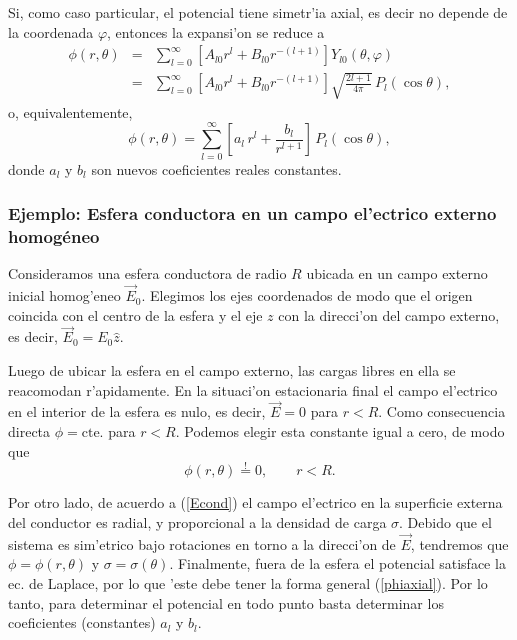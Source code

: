 Si, como caso particular, el potencial tiene simetr'ia axial, es decir no
depende de la coordenada $\varphi$, entonces la expansi'on se reduce a
\begin{eqnarray}
  \phi(r,\theta) &=& \sum_{l=0}^\infty\left[
  A_{l0}  r^l + B_{l0}  r^{-(l+1)}\right]  Y_{l0}(\theta,\varphi) \\
&=&\sum_{l=0}^\infty\left[  A_{l0}  r^l + B_{l0}
r^{-(l+1)}\right]\sqrt{\frac{2l+1}{4\pi}}\,P_l(\cos\theta) ,
\end{eqnarray}
o, equivalentemente,
\begin{equation}\label{phiaxial}
\boxed{\phi(r,\theta)=\sum_{l=0}^\infty\left[  a_l\,  r^l +
\frac{b_l}{r^{l+1}}\right]\,P_l(\cos\theta),}
\end{equation}
donde $a_l$ y $b_l$ son nuevos coeficientes reales constantes.

\subsubsection{Ejemplo: Esfera conductora en un campo el'ectrico externo homogéneo}\label{sec:esfcond}

Consideramos una esfera conductora de radio $R$ ubicada en un campo externo inicial homog'eneo $\vec{E}_0$. Elegimos los ejes coordenados de modo que el origen coincida con el centro de la esfera y el eje $z$ con la direcci'on del campo externo, es decir, $\vec{E}_0=E_0\hat{z}$.

Luego de ubicar la esfera en el campo externo, las cargas libres en ella se reacomodan r'apidamente. En la situaci'on estacionaria final el campo el'ectrico en el interior de la esfera es nulo, es decir, $\vec{E}=0$ para $r<R$. Como consecuencia directa $\phi=\text{cte.}$ para $r<R$. Podemos elegir esta constante igual a cero, de modo que
\begin{equation}
\phi(r,\theta)\stackrel{!}{=}0, \qquad r<R.
\end{equation}

Por otro lado, de acuerdo a (\ref{Econd}) el campo el'ectrico en la superficie externa del conductor es radial, y proporcional a la densidad de carga $\sigma$. Debido que el sistema es sim'etrico bajo rotaciones en torno a la direcci'on de $\vec{E}$, tendremos que $\phi=\phi(r,\theta)$ y $\sigma=\sigma(\theta)$. Finalmente, fuera de la esfera el potencial satisface la ec. de Laplace, por lo que 'este debe tener la forma general (\ref{phiaxial}). Por lo tanto, para determinar el potencial en todo punto basta determinar los coeficientes (constantes) $a_l$ y $b_l$.

